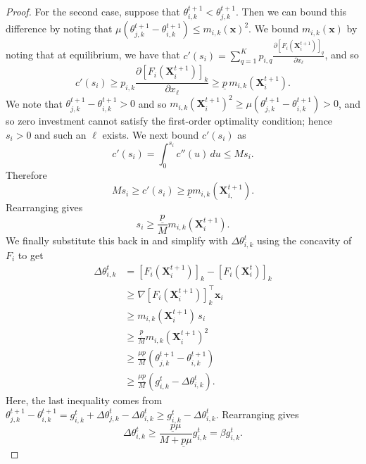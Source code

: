 \begin{proof}
For the second case, suppose that $\theta_{i,k}^{t+1}<\theta_{j,k}^{t+1}$.
Then we can bound this difference by noting that $\mu (\theta_{j,k}^{t+1}-\theta_{i,k}^{t+1}) \leq m_{i,k}(\mathbf{x})^2$. 
We bound $m_{i,k}(\mathbf{x})$ by noting that at equilibrium, we have that $c'(s_i)=\sum_{q=1}^K p_{i,q}\frac{\partial [F_i(\mathbf X_i^{t+1})]_q} {\partial x_\ell}$, and so 
\[
    c'(s_i)
    \ge
    p_{i,k}
    \frac{\partial [F_i(\mathbf X_i^{t+1})]_k}
         {\partial x_\ell}
    \ge
    \underline p\,
    m_{i,k}(\mathbf X_i^{t+1}).
\]
We note that $\theta_{j,k}^{t+1}-\theta_{i,k}^{t+1} > 0$ and so $ m_{i,k}(\mathbf X_i^{t+1})^2 \geq \mu (\theta^{t+1}_{j,k}-\theta^{t+1}_{i,k}) > 0$, and so zero investment cannot satisfy the first-order optimality condition; hence $s_i>0$ and such an
$\ell$ exists.
We next bound $c'(s_i)$ as 
\[
    c'(s_i)
    =
    \int_0^{s_i}c''(u)\,du
    \le Ms_i.
\]
Therefore
\[
Ms_{i} \geq c'(s_{i}) \geq \underline{p} m_{i,k}(\mathbf{X}_{i,}^{t+1}).
\]
Rearranging gives 
\[
    s_i
    \ge
    \frac{\underline p}{M}
    m_{i,k}(\mathbf X_i^{t+1}).
\]
We finally substitute this back in and simplify with $\Delta \theta^{t}_{i,k}$ using the concavity of $F_{i}$ to get 
\[
\begin{aligned}
    \Delta\theta_{i,k}^t
    &=
    [F_i(\mathbf X_i^{t+1})]_k
    -
    [F_i(\mathbf X_i^t)]_k\\
    &\ge
    \nabla [F_i(\mathbf X_i^{t+1})]_k^\top
    \mathbf{x}_i \\
    &\ge
    m_{i,k}(\mathbf X_i^{t+1})\,s_i \\ 
    &\ge 
    \frac{\underline p}{M}
    m_{i,k}(\mathbf X_i^{t+1})^2 \\ 
    &\ge 
    \frac{\mu \underline p}{M} (\theta_{j,k}^{t+1}-\theta_{i,k}^{t+1}) \\ 
    &\ge 
    \frac{\mu \underline p}{M} (g_{i,k}^t-\Delta \theta_{i,k}^t).
\end{aligned}
\]
Here, the last inequality comes from $\theta_{j,k}^{t+1}-\theta_{i,k}^{t+1} = 
    g_{i,k}^t
      +\Delta\theta_{j,k}^t
      -\Delta\theta_{i,k}^t \ge
    g_{i,k}^t-\Delta\theta_{i,k}^t$.
Rearranging gives 
\[
    \Delta\theta_{i,k}^t
    \ge
    \frac{\underline p\mu}
         {M+\underline p\mu}
    g_{i,k}^t
    =
    \beta g_{i,k}^t.
\]
\end{proof}
